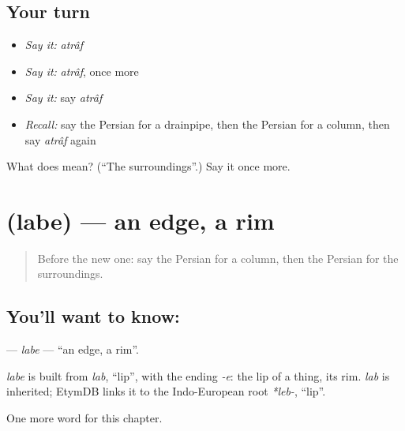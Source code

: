\subsection*{Your turn}
\begin{itemize}
\raggedright
  \item \emph{Say it:} \emph{atrâf}
  \item \emph{Say it:} \emph{atrâf}, once more
  \item \emph{Say it:} say \emph{atrâf}
  \item \emph{Recall:} say the Persian for a drainpipe, then the Persian for a column, then say \emph{atrâf} again
\end{itemize}

\begin{tcolorbox}[breakable,colback=teal!4,colframe=teal!35!black,title={Before you move on}]
What does  mean? (\textquotedblleft{}The surroundings\textquotedblright{}.) Say it once more.
\end{tcolorbox}
\section[\texorpdfstring{\fa{لبه} (labe)}{لبه (labe)}]{ (labe) — an edge, a rim}

\label{lesson:FA-C196-labe}



\begin{quote}
Before the new one: say the Persian for a column, then the Persian for the surroundings.
\end{quote}

\subsection*{You'll want to know: }
\textbf{} — \emph{labe} — \textquotedblleft{}an edge, a rim\textquotedblright{}.

\begin{cousinweb}
\emph{labe} is built from \emph{lab}, \textquotedblleft{}lip\textquotedblright{}, with the ending \emph{-e}: the lip of a thing, its rim. \emph{lab} is inherited; EtymDB links it to the Indo-European root \emph{*leb-}, \textquotedblleft{}lip\textquotedblright{}.
\end{cousinweb}

\begin{grammarlens}[title={What you've built}]
One more word for this chapter.
\end{grammarlens}

